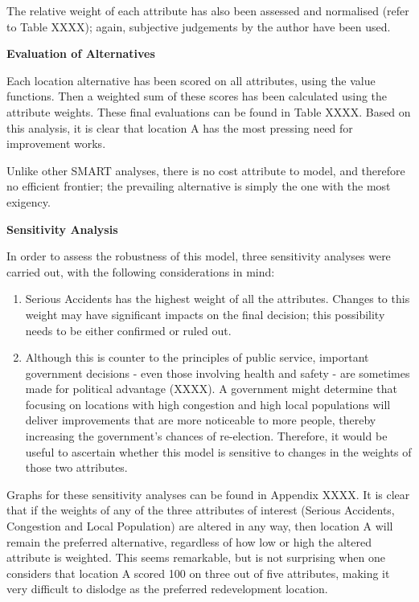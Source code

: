 \documentclass[11pt, a4paper]{article}
\begin{document}
    The relative weight of each attribute has also been assessed and normalised (refer to Table XXXX); again, subjective judgements by the author have been used.

    \textbf{Evaluation of Alternatives}

    Each location alternative has been scored on all attributes, using the value functions. Then a weighted sum of these scores has been calculated using the attribute weights. These final evaluations can be found in Table XXXX. Based on this analysis, it is clear that location A has the most pressing need for improvement works.

    Unlike other SMART analyses, there is no cost attribute to model, and therefore no efficient frontier; the prevailing alternative is simply the one with the most exigency.

    \textbf{Sensitivity Analysis}

    In order to assess the robustness of this model, three sensitivity analyses were carried out, with the following considerations in mind:

    \begin{enumerate}
        \item Serious Accidents has the highest weight of all the attributes. Changes to this weight may have significant impacts on the final decision; this possibility needs to be either confirmed or ruled out.
        \item Although this is counter to the principles of public service, important government decisions - even those involving health and safety - are sometimes made for political advantage (XXXX). A government might determine that focusing on locations with high congestion and high local populations will deliver improvements that are more noticeable to more people, thereby increasing the government's chances of re-election. Therefore, it would be useful to ascertain whether this model is sensitive to changes in the weights of those two attributes.
    \end{enumerate}

    Graphs for these sensitivity analyses can be found in Appendix XXXX. It is clear that if the weights of any of the three attributes of interest (Serious Accidents, Congestion and Local Population) are altered in any way, then location A will remain the preferred alternative, regardless of how low or high the altered attribute is weighted. This seems remarkable, but is not surprising when one considers that location A scored 100 on three out of five attributes, making it very difficult to dislodge as the preferred redevelopment location. 
\end{document}
